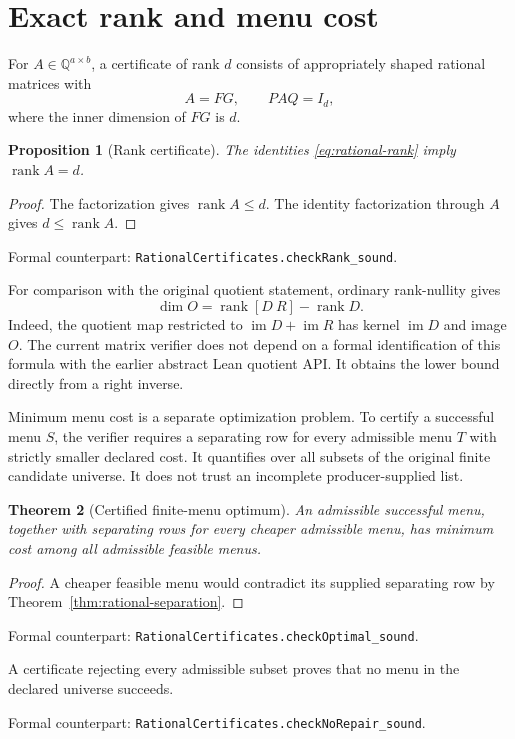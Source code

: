 \documentclass[11pt,letterpaper,oneside,openany]{book}
\theoremstyle{quiet}
\newtheorem{theorem}{Theorem}[chapter]
\newtheorem{proposition}[theorem]{Proposition}
\newcommand{\Q}{\mathbb{Q}}
\DeclareMathOperator{\im}{im}
\DeclareMathOperator{\rank}{rank}
\newcommand{\formal}[1]{\par\nobreak\begingroup\footnotesize\color{Slate}\sffamily Formal counterpart: \normalfont\nolinkurl{#1}.\par\endgroup}
\begin{document}
\section{Exact rank and menu cost}
For $A\in\Q^{a\times b}$, a certificate of rank $d$ consists of appropriately shaped rational matrices with
\begin{equation}\label{eq:rational-rank}
 A=FG,\qquad PAQ=I_d,
\end{equation}
where the inner dimension of $FG$ is $d$.

\begin{proposition}[Rank certificate]
The identities \eqref{eq:rational-rank} imply $\rank A=d$.
\end{proposition}
\begin{proof}
The factorization gives $\rank A\leq d$. The identity factorization through $A$ gives $d\leq\rank A$.
\end{proof}
\formal{RationalCertificates.checkRank_sound}

For comparison with the original quotient statement, ordinary rank-nullity gives
\begin{equation}\label{eq:rank-difference-new}
 \dim O=\rank[D\ R]-\rank D.
\end{equation}
Indeed, the quotient map restricted to $\im D+\im R$ has kernel $\im D$ and image $O$. The current matrix verifier does not depend on a formal identification of this formula with the earlier abstract Lean quotient API. It obtains the lower bound directly from a right inverse.

Minimum menu cost is a separate optimization problem. To certify a successful menu $S$, the verifier requires a separating row for every admissible menu $T$ with strictly smaller declared cost. It quantifies over all subsets of the original finite candidate universe. It does not trust an incomplete producer-supplied list.

\begin{theorem}[Certified finite-menu optimum]
An admissible successful menu, together with separating rows for every cheaper admissible menu, has minimum cost among all admissible feasible menus.
\end{theorem}
\begin{proof}
A cheaper feasible menu would contradict its supplied separating row by Theorem~\ref{thm:rational-separation}.
\end{proof}
\formal{RationalCertificates.checkOptimal_sound}

A certificate rejecting every admissible subset proves that no menu in the declared universe succeeds.
\formal{RationalCertificates.checkNoRepair_sound}
\end{document}

